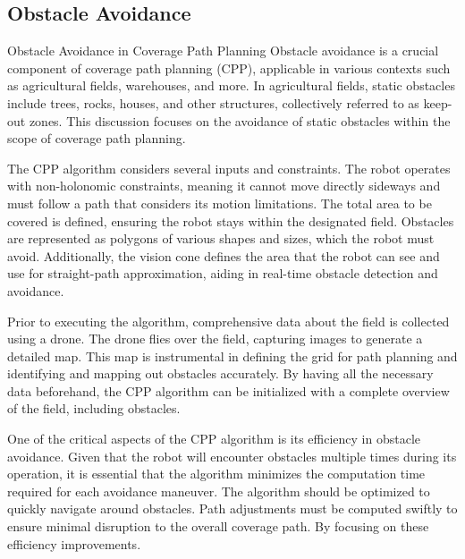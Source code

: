 
\subsection{Obstacle Avoidance}



\vspace*{6mm}    

Obstacle Avoidance in Coverage Path Planning
Obstacle avoidance is a crucial component of coverage path planning (CPP), applicable in various contexts such as agricultural fields, warehouses, and more. In agricultural fields, static obstacles include trees, rocks, houses, and other structures, collectively referred to as keep-out zones. This discussion focuses on the avoidance of static obstacles within the scope of coverage path planning.

\vspace*{6mm}  


The CPP algorithm considers several inputs and constraints. The robot operates with non-holonomic constraints, meaning it cannot move directly sideways and must follow a path that considers its motion limitations. The total area to be covered is defined, ensuring the robot stays within the designated field. Obstacles are represented as polygons of various shapes and sizes, which the robot must avoid. Additionally, the vision cone defines the area that the robot can see and use for straight-path approximation, aiding in real-time obstacle detection and avoidance.

\vspace*{6mm}  

Prior to executing the algorithm, comprehensive data about the field is collected using a drone. The drone flies over the field, capturing images to generate a detailed map. This map is instrumental in defining the grid for path planning and identifying and mapping out obstacles accurately. By having all the necessary data beforehand, the CPP algorithm can be initialized with a complete overview of the field, including obstacles.

\vspace*{6mm}  

One of the critical aspects of the CPP algorithm is its efficiency in obstacle avoidance. Given that the robot will encounter obstacles multiple times during its operation, it is essential that the algorithm minimizes the computation time required for each avoidance maneuver. The algorithm should be optimized to quickly navigate around obstacles. Path adjustments must be computed swiftly to ensure minimal disruption to the overall coverage path. By focusing on these efficiency improvements.


